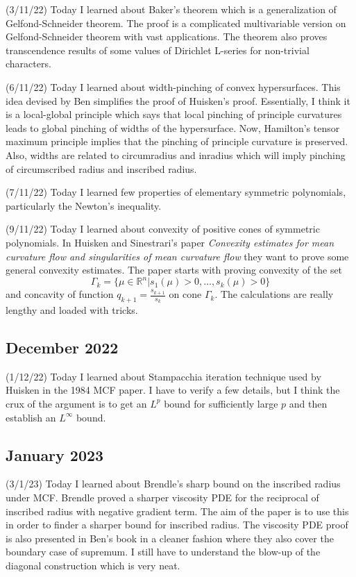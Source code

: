 \documentclass[12pt,a4paper]{article}
\newcommand{\R}{\mathbb{R}}
\begin{document}
(3/11/22) Today I learned about Baker's theorem which is a generalization of Gelfond-Schneider theorem. The proof is a complicated multivariable version on Gelfond-Schneider theorem with vast applications. The theorem also proves transcendence results of some values of Dirichlet L-series for non-trivial characters. 

(6/11/22) Today I learned about width-pinching of convex hypersurfaces. This idea devised by Ben simplifies the proof of Huisken's proof. Essentially, I think it is a local-global principle which says that local pinching of principle curvatures leads to global pinching of widths of the hypersurface. Now, Hamilton's tensor maximum principle implies that the pinching of principle curvature is preserved. Also, widths are related to circumradius and inradius which will imply pinching of circumscribed radius and inscribed radius. 

(7/11/22) Today I learned few properties of elementary symmetric polynomials, particularly the Newton's inequality. 

(9/11/22) Today I learned about convexity of positive cones of symmetric polynomials. In Huisken and Sinestrari's paper \textit{Convexity estimates for mean curvature flow and singularities of mean curvature flow} they want to prove some general convexity estimates. The paper starts with proving convexity of the set 
\[ \Gamma_{k} = \{ \mu  \in \R^{n} | s_{1}(\mu)>0, \ldots, s_{k}(\mu)>0\} \]
and concavity of function $ q_{k+1} = \frac{s_{k+1}}{s_{k}} $ on cone $  \Gamma_{k}$. The calculations are really lengthy and loaded with tricks.

\subsection*{December 2022}

\quad (1/12/22) Today I learned about Stampacchia iteration technique used by Huisken in the 1984 MCF paper. I have to verify a few details, but I think the crux of the argument is to get an $ L^{p} $ bound for sufficiently large $ p $ and then establish an $ L^{\infty} $ bound.

\subsection*{January 2023}

\quad (3/1/23) Today I learned about Brendle's sharp bound on the inscribed radius under MCF. Brendle proved a sharper viscosity PDE for the reciprocal of inscribed radius with negative gradient term. The aim of the paper is to use this in order to finder a sharper bound for inscribed radius. The viscosity PDE proof is also presented in Ben's book in a cleaner fashion where they also cover the boundary case of supremum. I still have to understand the blow-up of the diagonal construction which is very neat. 
\end{document}
